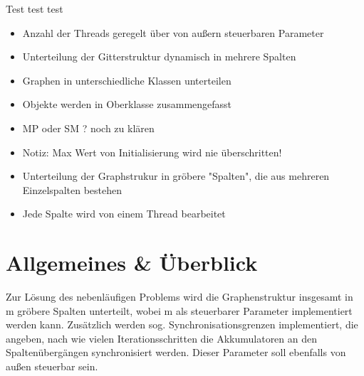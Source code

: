 
\usepackage{pdfpages}
\usepackage{listings}



\newcommand{\subttl}{\textbf{Milestone 1}}
\newcommand{\StudNameOne}{Jens Heinen (2542182)}
\newcommand{\StudNameTwo}{Lukas Schaal (2539218)}
\newcommand{\StudNameThree}{Christoph Rosenhauer (2549220)}

\newcommand{\ndt}{Nichtdeterminismus }
Test test test

\begin{itemize}
	\item Anzahl der Threads geregelt über von außern steuerbaren Parameter
	\item Unterteilung der Gitterstruktur dynamisch in mehrere Spalten
	\item Graphen in unterschiedliche Klassen unterteilen
	\item Objekte werden in Oberklasse zusammengefasst 
	\item MP oder SM ? noch zu klären
	\item Notiz: Max Wert von Initialisierung wird nie überschritten!
	\item Unterteilung der Graphstrukur in gröbere "Spalten", die aus mehreren Einzelspalten bestehen
	\item Jede Spalte wird von einem Thread bearbeitet
	
\end{itemize}


\section{Allgemeines \& Überblick}
Zur Lösung des nebenläufigen Problems wird die Graphenstruktur insgesamt in m gröbere Spalten unterteilt, wobei m als steuerbarer Parameter implementiert werden kann. Zusätz\-lich werden sog. Synchronisationsgrenzen implementiert, die angeben, nach wie vielen Iterationsschritten die Akkumulatoren an den Spaltenübergängen synchronisiert werden. Dieser Parameter soll ebenfalls von außen steuerbar sein. 


